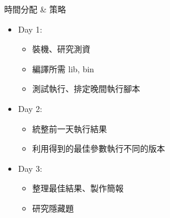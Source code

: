 \documentclass[aspectratio=169]{beamer}
\begin{document}
    \begin{frame}{時間分配 \& 策略}
        \begin{itemize}
            \item Day 1:
            \begin{itemize}
                \item 裝機、研究測資
                \item 編譯所需 lib, bin
                \item 測試執行、排定晚間執行腳本
            \end{itemize}
            \item Day 2:
            \begin{itemize}
                \item 統整前一天執行結果
                \item 利用得到的最佳參數執行不同的版本
            \end{itemize}
            \item Day 3:
            \begin{itemize}
                \item 整理最佳結果、製作簡報
                \item 研究隱藏題
            \end{itemize}
        \end{itemize}
    \end{frame}
\end{document}
